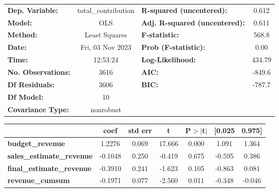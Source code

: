 \begin{center}
\begin{tabular}{lclc}
\toprule
\textbf{Dep. Variable:}                & total\_contribution & \textbf{  R-squared (uncentered):}      &     0.612   \\
\textbf{Model:}                        &         OLS         & \textbf{  Adj. R-squared (uncentered):} &     0.611   \\
\textbf{Method:}                       &    Least Squares    & \textbf{  F-statistic:       }          &     568.8   \\
\textbf{Date:}                         &   Fri, 03 Nov 2023  & \textbf{  Prob (F-statistic):}          &     0.00    \\
\textbf{Time:}                         &       12:53:24      & \textbf{  Log-Likelihood:    }          &    434.79   \\
\textbf{No. Observations:}             &          3616       & \textbf{  AIC:               }          &    -849.6   \\
\textbf{Df Residuals:}                 &          3606       & \textbf{  BIC:               }          &    -787.7   \\
\textbf{Df Model:}                     &            10       & \textbf{                     }          &             \\
\textbf{Covariance Type:}              &      nonrobust      & \textbf{                     }          &             \\
\bottomrule
\end{tabular}
\begin{tabular}{lcccccc}
                                       & \textbf{coef} & \textbf{std err} & \textbf{t} & \textbf{P$> |$t$|$} & \textbf{[0.025} & \textbf{0.975]}  \\
\midrule
\textbf{budget\_revenue}               &       1.2276  &        0.069     &    17.666  &         0.000        &        1.091    &        1.364     \\
\textbf{sales\_estimate\_revenue}      &      -0.1048  &        0.250     &    -0.419  &         0.675        &       -0.595    &        0.386     \\
\textbf{final\_estimate\_revenue}      &      -0.3910  &        0.241     &    -1.623  &         0.105        &       -0.863    &        0.081     \\
\textbf{revenue\_cumsum}               &      -0.1971  &        0.077     &    -2.560  &         0.011        &       -0.348    &       -0.046     \\

\end{tabular}
\end{center}
